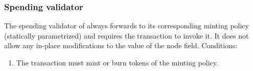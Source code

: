 \documentclass[../midgard.tex]{subfiles}
\begin{document}
\subsubsection{Spending validator}
\label{h:retired-operators-spending-validator}

The spending validator of  always forwards to its corresponding minting policy (statically parametrized) and requires the transaction to invoke it.
It does not allow any in-place modifications to the  value of the node  field.
Conditions:
\begin{enumerate}
    \item The transaction must mint or burn tokens of the  minting policy.
\end{enumerate}
\end{document}
